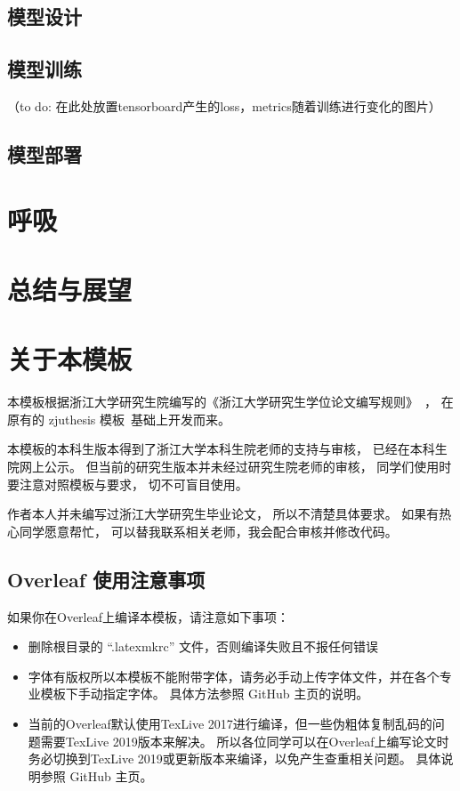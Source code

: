 \section{模型设计}
\section{模型训练}
（to do: 在此处放置tensorboard产生的loss，metrics随着训练进行变化的图片）

\section{模型部署}





\chapter{呼吸}

\chapter{总结与展望}

\chapter{关于本模板}

本模板根据浙江大学研究生院编写的《浙江大学研究生学位论文编写规则》~\cite{zjugradthesisrules}，
在原有的 zjuthesis 模板~\cite{zjuthesis}基础上开发而来。

本模板的本科生版本\cite{zjuthesisrules}得到了浙江大学本科生院老师的支持与审核，
已经在本科生院网上公示。
但当前的研究生版本并未经过研究生院老师的审核，
同学们使用时要注意对照模板与要求，
切不可盲目使用。

作者本人并未编写过浙江大学研究生毕业论文，
所以不清楚具体要求。
如果有热心同学愿意帮忙，
可以替我联系相关老师，我会配合审核并修改代码。

\section{Overleaf 使用注意事项}

如果你在Overleaf上编译本模板，请注意如下事项：

\begin{itemize}
    \item 删除根目录的 ``.latexmkrc'' 文件，否则编译失败且不报任何错误
    \item 字体有版权所以本模板不能附带字体，请务必手动上传字体文件，并在各个专业模板下手动指定字体。
          具体方法参照 GitHub 主页的说明。
    \item 当前的Overleaf默认使用TexLive 2017进行编译，但一些伪粗体复制乱码的问题需要TexLive 2019版本来解决。
          所以各位同学可以在Overleaf上编写论文时务必切换到TexLive 2019或更新版本来编译，以免产生查重相关问题。
          具体说明参照 GitHub 主页。
\end{itemize}


